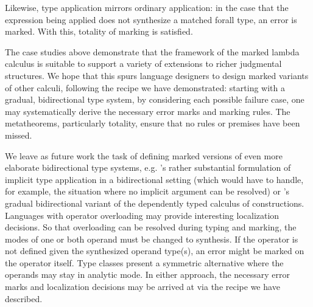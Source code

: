 Likewise, type application mirrors ordinary application: in the case that the expression being applied does not synthesize a matched forall type, an error is marked. With this, totality of marking is satisfied.
%
\begin{mathpar}

\end{mathpar}

The case studies above demonstrate that the framework of the marked lambda calculus is suitable to support a variety of extensions to richer judgmental structures.
We hope that this spurs language designers to design marked variants of other calculi, following the
recipe we have demonstrated: starting with a gradual, bidirectional type system, by considering each
possible failure case, one may systematically derive the necessary error marks and marking rules.
The metatheorems, particularly totality, ensure that no rules or premises have been missed.

We leave as future work the task of defining marked versions of even more elaborate bidirectional
type systems, e.g. \citet{dunfield2013}'s rather substantial formulation of implicit type
application in a bidirectional setting (which would have to handle, for example, the situation where
no implicit argument can be resolved) or \citet{lennonbertrand2022}'s gradual bidirectional
variant of the dependently typed calculus of constructions.
Languages with operator overloading may provide interesting localization decisions.
So that overloading can be resolved during typing and marking, the modes of one or both operand must be changed to synthesis.
If the operator is not defined given the synthesized operand type(s), an error might be marked on the operator itself.
Type classes \cite{wadler1989} present a symmetric alternative where the operands may stay in analytic mode.
In either approach, the necessary error marks and localization decisions may be arrived at via the recipe we have described.